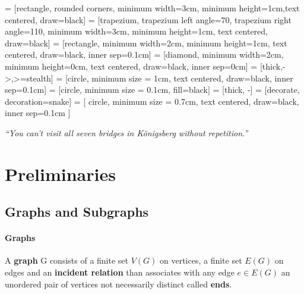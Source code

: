 
\usepackage{subcaption}
\usepackage{makecell}

\usetikzlibrary{shapes.geometric, arrows}
     = [rectangle, rounded corners, minimum width=3cm, minimum height=1cm,text centered, draw=black]
     = [trapezium, trapezium left angle=70, trapezium right angle=110, minimum width=3cm, minimum height=1cm, text centered, draw=black]
     = [rectangle, minimum width=2cm, minimum height=1cm, text centered, draw=black, inner sep=0.1cm]
     = [diamond, minimum width=2cm, minimum height=0cm, text centered, draw=black, inner sep=0cm]
     = [thick,->,>=stealth]
     = [circle, minimum size = 1cm, text centered, draw=black, inner sep=0.1cm]
     = [circle, minimum size = 0.1cm, fill=black]
     = [thick, -]
     = [decorate, decoration={snake}]
     = [
        circle, 
        minimum size = 0.7cm, 
        text centered, 
        draw=black, 
        inner sep=0.1cm
    ]
\renewcommand{\docTitle}{Lecture 5 - Graph Algorithms}
\renewcommand{\docAuthor}{Lan Peng, Ph.D.}
\renewcommand{\docAffil}{School of Management, Shanghai University, Shanghai, China}

    \titleSec

    \begin{center}
        \textit{``You can't visit all seven bridges in Königsberg without repetition.''}
    \end{center}

    \section{Preliminaries}
        \subsection{Graphs and Subgraphs}
            \paragraph{Graphs}
                \begin{definition}[Graph]
                    A \textbf{graph} G consists of a finite set $V(G)$ on vertices, a finite set $E(G)$ on edges and an \textbf{incident relation} than associates with any edge $e\in E(G)$ an unordered pair of vertices not necessarily distinct called \textbf{ends}.
                \end{definition}

